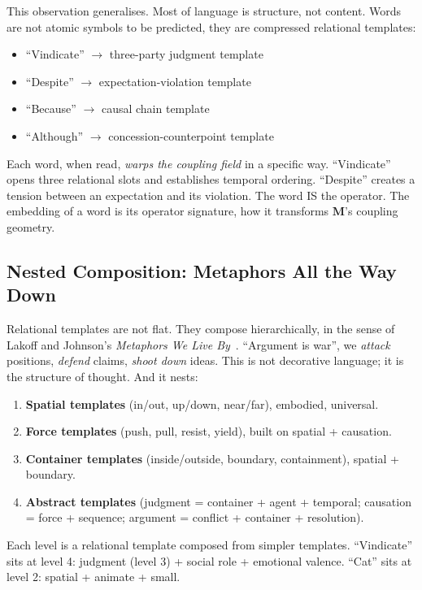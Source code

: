 \documentclass[11pt, a4paper]{article}
\newcommand{\M}{\mathbf{M}}
\theoremstyle{plain}
\theoremstyle{definition}
\theoremstyle{remark}
\begin{document}
This observation generalises.
Most of language is structure, not content.
Words are not atomic symbols to be predicted, they are compressed relational templates:
\begin{itemize}[nosep]
\item ``Vindicate'' $\to$ three-party judgment template
\item ``Despite'' $\to$ expectation-violation template
\item ``Because'' $\to$ causal chain template
\item ``Although'' $\to$ concession-counterpoint template
\end{itemize}

Each word, when read, \emph{warps the coupling field} in a specific way.
``Vindicate'' opens three relational slots and establishes temporal ordering.
``Despite'' creates a tension between an expectation and its violation.
The word IS the operator.
The embedding of a word is its operator signature, how it transforms $\M$'s coupling geometry.

\subsection{Nested Composition: Metaphors All the Way Down}

Relational templates are not flat.
They compose hierarchically, in the sense of Lakoff and Johnson's \emph{Metaphors We Live By}~\cite{lakoff1980metaphors}.
``Argument is war'', we \emph{attack} positions, \emph{defend} claims, \emph{shoot down} ideas.
This is not decorative language; it is the structure of thought.
And it nests:

\begin{enumerate}[nosep]
\item \textbf{Spatial templates} (in/out, up/down, near/far), embodied, universal.
\item \textbf{Force templates} (push, pull, resist, yield), built on spatial + causation.
\item \textbf{Container templates} (inside/outside, boundary, containment), spatial + boundary.
\item \textbf{Abstract templates} (judgment = container + agent + temporal; causation = force + sequence; argument = conflict + container + resolution).
\end{enumerate}

Each level is a relational template composed from simpler templates.
``Vindicate'' sits at level 4: judgment (level 3) + social role + emotional valence.
``Cat'' sits at level 2: spatial + animate + small.
\end{document}
